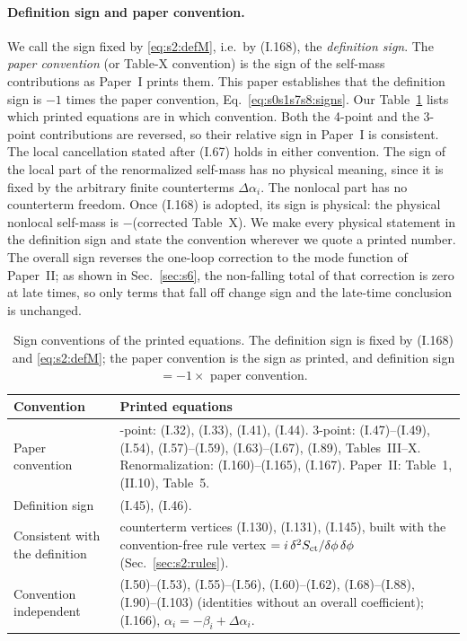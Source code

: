 \documentclass[aps,prd,onecolumn,10pt,nofootinbib,floatfix]{revtex4-2}
\newcommand{\PI}{Paper~I}
\newcommand{\PII}{Paper~II}
\newcommand{\eqI}[1]{(I.#1)}
\newcommand{\eqII}[1]{(II.#1)}
\begin{document}
\paragraph*{Definition sign and paper convention.}
We call the sign fixed by \eqref{eq:s2:defM}, i.e.\ by \eqI{168}, the
\emph{definition sign}. The \emph{paper convention} (or Table-X convention)
is the sign of the self-mass contributions as \PI{} prints them. This
paper establishes that the definition sign is $-1$ times the paper
convention, Eq.~\eqref{eq:s0s1s7s8:signs}.
Our Table~\ref{tab:s2:conventions} lists which printed equations are in which
convention. Both the 4-point and the 3-point contributions are reversed, so
their relative sign in \PI{} is consistent. The local cancellation stated
after \eqI{67} holds in either convention. The sign of the local part of the
renormalized self-mass has no physical meaning, since it is fixed by the
arbitrary finite counterterms $\Delta\alpha_i$. The nonlocal part has no
counterterm freedom. Once \eqI{168} is adopted, its sign is physical: the
physical nonlocal self-mass is $-$(corrected Table~X). We make every
physical statement in the definition sign and state the convention wherever
we quote a printed number. The overall sign reverses the one-loop
correction to the mode function of \PII; as shown in Sec.~\ref{sec:s6},
the non-falling total of that correction is zero at late times, so only
terms that fall off change sign and the late-time conclusion is unchanged.

\begin{table}[tb]
\caption{Sign conventions of the printed equations. The definition sign is
fixed by \eqI{168} and \eqref{eq:s2:defM}; the paper convention is the sign
as printed, and definition sign $=-1\times$ paper convention.}
\label{tab:s2:conventions}
\begin{ruledtabular}
\begin{tabular}{>{\raggedright\arraybackslash}p{}>{\raggedright\arraybackslash}p{}}
Convention & Printed equations\\
\hline
Paper convention & 4-point: \eqI{32}, \eqI{33}, \eqI{41}, \eqI{44}.
3-point: \eqI{47}--\eqI{49}, \eqI{54}, \eqI{57}--\eqI{59}, \eqI{63}--\eqI{67}, \eqI{89}, Tables~III--X.
Renormalization: \eqI{160}--\eqI{165}, \eqI{167}.
\PII: Table~1, \eqII{10}, Table~5.\\
Definition sign & \eqI{45}, \eqI{46}.\\
Consistent with the definition & counterterm vertices \eqI{130}, \eqI{131}, \eqI{145}, built with the convention-free rule
vertex $=i\,\delta^2S_{\rm ct}/\delta\phi\,\delta\phi$ (Sec.~\ref{sec:s2:rules}).\\
Convention independent & \eqI{50}--\eqI{53}, \eqI{55}--\eqI{56},
\eqI{60}--\eqI{62}, \eqI{68}--\eqI{88}, \eqI{90}--\eqI{103} (identities without an overall coefficient);
\eqI{166}, $\alpha_i=-\beta_i+\Delta\alpha_i$.\\
\end{tabular}
\end{ruledtabular}
\end{table}
\end{document}
